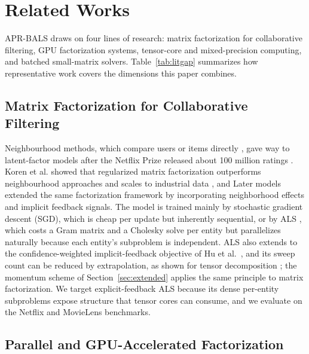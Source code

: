 \section{Related Works}
\label{sec:related}

APR-BALS draws on four lines of research: matrix factorization for collaborative filtering, GPU factorization systems, tensor-core and mixed-precision computing, and batched small-matrix solvers. Table~\ref{tab:litgap} summarizes how representative work covers the dimensions this paper combines.

\subsection{Matrix Factorization for Collaborative Filtering}

Neighbourhood methods, which compare users or items directly \cite{sarwar2001item}, gave way to latent-factor models after the Netflix Prize released about 100 million ratings \cite{bennett2007netflix}. Koren et al. showed that regularized matrix factorization outperforms neighbourhood approaches and scales to industrial data \cite{koren2009matrix}, and Later models extended the same factorization framework by incorporating neighborhood effects and implicit feedback signals\cite{koren2008factorization}. The model is trained mainly by stochastic gradient descent (SGD), which is cheap per update but inherently sequential, or by ALS \cite{zhou2008largescale}, which costs a Gram matrix and a Cholesky solve per entity but parallelizes naturally because each entity's subproblem is independent. ALS also extends to the confidence-weighted implicit-feedback objective of Hu et al.\ \cite{hu2008collaborative}, and its sweep count can be reduced by extrapolation, as shown for tensor decomposition \cite{ma2022pairwise,evans2023blockwise}; the momentum scheme of Section~\ref{sec:extended} applies the same principle to matrix factorization. We target explicit-feedback ALS because its dense per-entity subproblems expose structure that tensor cores can consume, and we evaluate on the Netflix and MovieLens \cite{harper2016movielens} benchmarks.

\subsection{Parallel and GPU-Accelerated Factorization}

